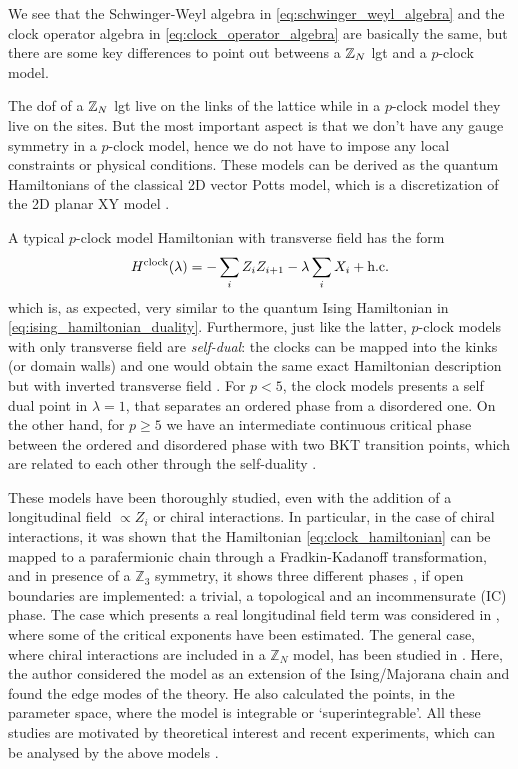 We see that the Schwinger-Weyl algebra in \eqref{eq:schwinger_weyl_algebra} and the clock operator algebra in \eqref{eq:clock_operator_algebra} are basically the same, but there are some key differences to point out betweens a $\mathbb{Z}_N$ \ac{lgt} and a $p$-clock model.

The \ac{dof} of a $\mathbb{Z}_N$ \ac{lgt} live on the links of the lattice while in a $p$-clock model they live on the sites.
But the most important aspect is that we don't have any gauge symmetry in a $p$-clock model, hence we do not have to impose any local constraints or physical conditions.
These models can be derived as the quantum Hamiltonians of the classical 2D vector Potts model, which is a discretization of the 2D planar XY model \cite{ortiz2012dualities}.

A typical $p$-clock model Hamiltonian with transverse field has the form
\begin{equation}
    H^{\text{clock}}(\lambda) = - \sum_{i} Z_i Z_{i+1} - \lambda \sum_{i} X_i + \text{h.c.}
    \label{eq:clock_hamiltonian}
\end{equation}
which is, as expected, very similar to the quantum Ising Hamiltonian in \eqref{eq:ising_hamiltonian_duality}.
Furthermore, just like the latter, $p$-clock models with only transverse field are \emph{self-dual}:
the clocks can be mapped into the kinks (or domain walls) and one would obtain the same exact Hamiltonian description but with inverted transverse field \cite{ortiz2012dualities}.
For $p < 5$, the clock models presents a self dual point in $\lambda = 1$, that separates an ordered phase from a disordered one.
On the other hand, for $p \geq 5$ we have an intermediate continuous critical phase between the ordered and disordered phase with two BKT transition points, which are related to each other through the self-duality \cite{sun2019phase}.

These models have been thoroughly studied, even with the addition of a longitudinal field $\propto Z_i$ \cite{baxter1982exactlysm} or chiral interactions.
In particular, in the case of chiral interactions, it was shown \cite{fendley2012parafermions} that the Hamiltonian \eqref{eq:clock_hamiltonian} can be mapped to a parafermionic chain through a Fradkin-Kadanoff transformation, and in presence of a $\mathbb{Z}_3$ symmetry, it shows three different phases \cite{zhuang2015clock}, if open boundaries are implemented: a trivial, a topological and an incommensurate (IC) phase.
The case which presents a real longitudinal field term was considered in \cite{huang2019clock},  where some of the critical exponents have been estimated.
The general case, where chiral interactions are included in a $\mathbb{Z}_N$ model, has been studied in \cite{fendley2012parafermions}.
Here, the author considered the model as an extension of the Ising/Majorana chain and found the edge modes of the theory.
He also calculated the points, in the parameter space, where the model is integrable or `superintegrable'.
All these studies are motivated by theoretical interest and recent experiments, which can be analysed by the above models \cite{bernien2017probing}.


